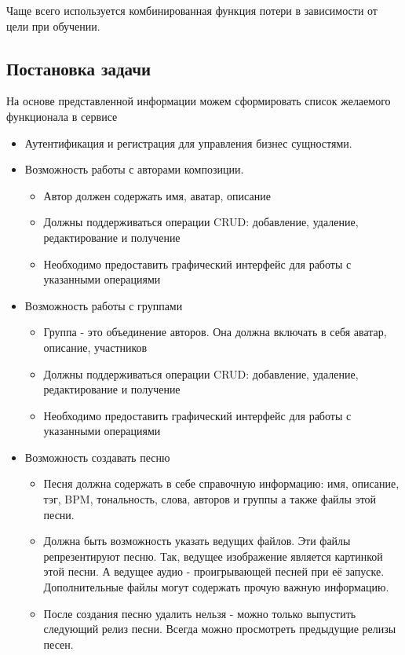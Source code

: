 \documentclass[a4paper, 12pt, oneside]{article}
\begin{document}
Чаще всего используется комбинированная функция потери в зависимости от цели при обучении.

\subsection{Постановка задачи}

На основе представленной информации можем сформировать список желаемого функционала в сервисе

\begin{itemize}
	\item Аутентификация и регистрация для управления бизнес сущностями.
	\item Возможность работы с авторами композиции.
	\begin{itemize}
		\item Автор должен содержать имя, аватар, описание
		\item Должны поддерживаться операции CRUD: добавление, удаление, редактирование и получение 
		\item Необходимо предоставить графический интерфейс для работы с указанными операциями
	\end{itemize}
	\item Возможность работы с группами
	\begin{itemize}
		\item Группа - это объединение авторов. Она должна включать в себя аватар, описание, участников
		\item Должны поддерживаться операции CRUD: добавление, удаление, редактирование и получение 
		\item Необходимо предоставить графический интерфейс для работы с указанными операциями
	\end{itemize}
	\item Возможность создавать песню
	\begin{itemize}
		\item Песня должна содержать в себе справочную информацию: имя, описание, тэг, BPM, тональность, слова, авторов и группы а также файлы этой песни.
		\item Должна быть возможность указать ведущих файлов. Эти файлы репрезентируют песню. Так, ведущее изображение является картинкой этой песни. А ведущее аудио - проигрывающей песней при её запуске. Дополнительные файлы могут содержать прочую важную информацию.
		\item После создания песню удалить нельзя - можно только выпустить следующий релиз песни. Всегда можно просмотреть предыдущие релизы песен.

\end{itemize}
\end{itemize}
\end{document}
